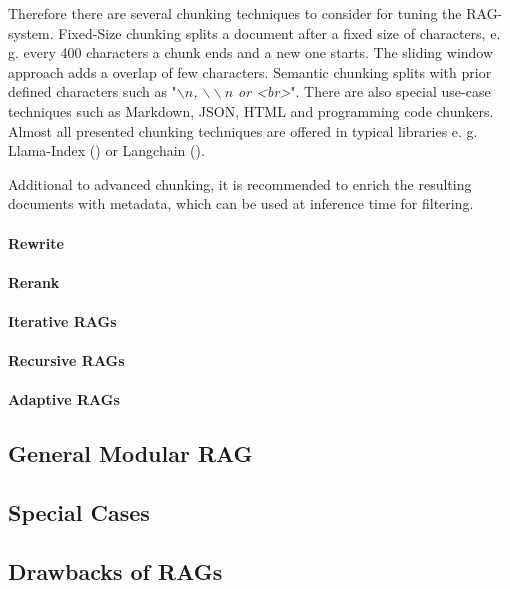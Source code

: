 Therefore there are several chunking techniques to consider for tuning the RAG-system. Fixed-Size chunking splits a document after a fixed size of characters, e. g. every 400 characters a chunk ends and a new one starts. The sliding window approach adds a overlap of few characters. Semantic chunking splits with prior defined characters such as "\textit{$\backslash n$, $\backslash\backslash n$ or <br>}". There are also special use-case techniques such as Markdown, JSON, HTML and programming code chunkers. Almost all presented chunking techniques are offered in typical libraries e. g. Llama-Index (\citet{Liu_LlamaIndex_2022}) or Langchain (\citeauthor{Chase_LangChain_2022}).

Additional to advanced chunking, it is recommended to enrich the resulting documents with metadata, which can be used at inference time for filtering. 


\paragraph{Rewrite}
\label{sec:rewrite}

\paragraph{Rerank}
\label{sec:rerank}

\paragraph{Iterative RAGs}
\label{sec:iterative}

\paragraph{Recursive RAGs}
\label{sec:recursive}

\paragraph{Adaptive RAGs}
\label{sec:adaptive}

\subsection{General Modular RAG}
\label{sec:modular_rag}

\subsection{Special Cases}
\label{sec:special_cases}

\subsection{Drawbacks of RAGs}
\label{sec:drawbacks}
